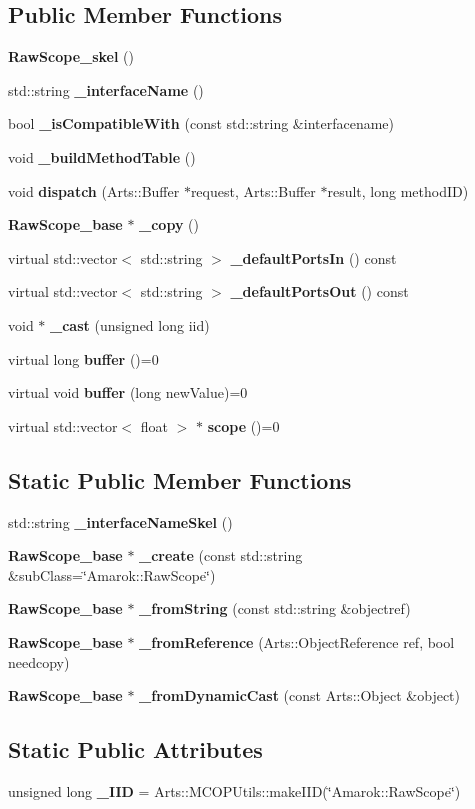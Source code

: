 \subsection*{Public Member Functions}
\begin{CompactItemize}
\item 
{\bf Raw\-Scope\_\-skel} ()
\item 
std::string {\bf \_\-interface\-Name} ()
\item 
bool {\bf \_\-is\-Compatible\-With} (const std::string \&interfacename)
\item 
void {\bf \_\-build\-Method\-Table} ()
\item 
void {\bf dispatch} (Arts::Buffer $\ast$request, Arts::Buffer $\ast$result, long method\-ID)
\item 
{\bf Raw\-Scope\_\-base} $\ast$ {\bf \_\-copy} ()
\item 
virtual std::vector$<$ std::string $>$ {\bf \_\-default\-Ports\-In} () const 
\item 
virtual std::vector$<$ std::string $>$ {\bf \_\-default\-Ports\-Out} () const 
\item 
void $\ast$ {\bf \_\-cast} (unsigned long iid)
\item 
virtual long {\bf buffer} ()=0
\item 
virtual void {\bf buffer} (long new\-Value)=0
\item 
virtual std::vector$<$ float $>$ $\ast$ {\bf scope} ()=0
\end{CompactItemize}
\subsection*{Static Public Member Functions}
\begin{CompactItemize}
\item 
std::string {\bf \_\-interface\-Name\-Skel} ()
\item 
{\bf Raw\-Scope\_\-base} $\ast$ {\bf \_\-create} (const std::string \&sub\-Class=\char`\"{}Amarok::Raw\-Scope\char`\"{})
\item 
{\bf Raw\-Scope\_\-base} $\ast$ {\bf \_\-from\-String} (const std::string \&objectref)
\item 
{\bf Raw\-Scope\_\-base} $\ast$ {\bf \_\-from\-Reference} (Arts::Object\-Reference ref, bool needcopy)
\item 
{\bf Raw\-Scope\_\-base} $\ast$ {\bf \_\-from\-Dynamic\-Cast} (const Arts::Object \&object)
\end{CompactItemize}
\subsection*{Static Public Attributes}
\begin{CompactItemize}
\item 
unsigned long {\bf \_\-IID} = Arts::MCOPUtils::make\-IID(\char`\"{}Amarok::Raw\-Scope\char`\"{})
\end{CompactItemize}
